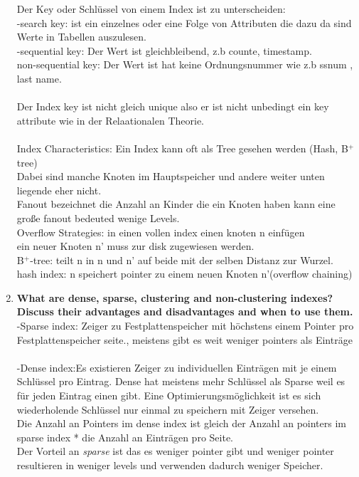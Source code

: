 \documentclass[12pt]{article}\pagestyle{myheadings}
\theoremstyle{plain}
\begin{document}
\begin{enumerate}
Der Key oder Schlüssel von einem Index ist zu unterscheiden:\\
-search key: ist ein einzelnes oder eine Folge von Attributen die dazu da sind Werte in Tabellen auszulesen.\\
-sequential key: Der Wert ist gleichbleibend, z.b counte, timestamp.\\
non-sequential key: Der Wert ist hat keine Ordnungsnummer wie z.b ssnum , last name.\\ \\
Der Index key ist nicht gleich unique also er ist nicht unbedingt ein key attribute wie in der Relaationalen Theorie.\\\\
Index Characteristics: Ein Index kann oft als Tree gesehen werden (Hash, B$^+$tree)\\
Dabei sind manche Knoten im Hauptspeicher und andere weiter unten liegende eher nicht.\\
Fanout bezeichnet die Anzahl an Kinder die ein Knoten haben kann eine große fanout bedeuted wenige Levels.\\
Overflow Strategies: in einen vollen index einen knoten n einfügen \\
ein neuer Knoten n' muss zur disk zugewiesen werden.\\
B$^+$-tree: teilt n in n und n' auf beide mit der selben Distanz zur Wurzel.\\
hash index: n speichert pointer zu einem neuen Knoten n'(overflow chaining)
\item \textbf{What are dense, sparse, clustering and non-clustering indexes? Discuss their advantages and disadvantages and
when to use them.} \\
-Sparse index: Zeiger zu Festplattenspeicher mit höchstens einem Pointer pro Festplattenspeicher seite., meistens gibt es weit weniger pointers als Einträge\\ \\
-Dense index:Es existieren Zeiger zu individuellen Einträgen mit je einem Schlüssel pro Eintrag.
Dense hat meistens mehr Schlüssel als Sparse weil es für jeden Eintrag einen gibt. Eine Optimierungsmöglichkeit ist es sich wiederholende Schlüssel nur einmal zu speichern mit Zeiger versehen.\\
Die Anzahl an Pointers im  dense index ist gleich der Anzahl an pointers im sparse index * die Anzahl an Einträgen pro Seite.\\
Der Vorteil an \textit{sparse} ist das es weniger pointer gibt und weniger pointer resultieren in weniger levels und verwenden dadurch weniger Speicher.\\

\end{enumerate}
\end{document}
